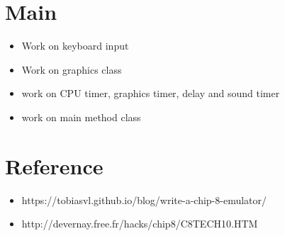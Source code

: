\documentclass{article}
\begin{document}
\section*{Main}
\begin{itemize}
	\item Work on keyboard input
	\item Work on graphics class
	\item work on CPU timer, graphics timer, delay and sound timer
	\item work on main method class
\end{itemize}

\section*{Reference}
\begin{itemize}
	\item https://tobiasvl.github.io/blog/write-a-chip-8-emulator/
	\item http://devernay.free.fr/hacks/chip8/C8TECH10.HTM
\end{itemize}
\end{document}
